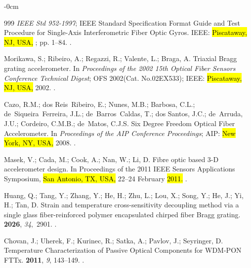 \documentclass[sensors,article,accept,pdftex,moreauthors]{Definitions/mdpi}
\begin{document}
\begin{adjustwidth}{-\extralength}{0cm}
\begin{thebibliography}{999}
{\em IEEE Std 952-1997};
\newblock IEEE Standard Specification Format Guide and Test Procedure for Single-Axis Interferometric Fiber Optic Gyros. IEEE: \hl{Piscataway, NJ, USA,}
; pp. 1--84.
.

Morikawa, S.; Ribeiro, A.; Regazzi, R.; Valente, L.; Braga, A.
\newblock Triaxial Bragg grating accelerometer.
\newblock In \emph{Proceedings of the 2002 15th Optical Fiber Sensors Conference Technical Digest}; {OFS} 2002(Cat. No.02EX533); {IEEE}:  \hl{Piscataway, NJ, USA,} 2002.
.

Cazo, R.M.; dos Reis~Ribeiro, E.; Nunes, M.B.; Barbosa, C.L.; de~Siqueira~Ferreira, J.L.; de~Barros~Caldas, T.; dos Santos, J.C.; de~Arruda, J.U.; Cordeiro, C.M.B.; de~Matos, C.J.S.
\newblock Six Degree Freedom Optical Fiber Accelerometer.
\newblock In \emph{Proceedings of the AIP Conference Proceedings}; AIP: \hl{New York, NY, USA,} 2008.
.

Masek, V.; Cada, M.; Cook, A.; Nan, W.; Li, D.
\newblock Fibre optic based 3-D accelerometer design.
\newblock In Proceedings of the 2011 IEEE Sensors Applications Symposium,  \hl{San Antonio, TX, USA,} 22--24 February \hl{2011.} %
.

Huang, Q.; Tang, Y.; Zhang, Y.; He, H.; Zhu, L.; Lou, X.; Song, Y.; He, J.; Yi, H.; Tan, D.
\newblock Strain and temperature cross-sensitivity decoupling method via a single glass fiber-reinforced polymer encapsulated chirped fiber Bragg grating.
 {\bf 2026}, {\em 34},~2901.
.

Chovan, J.; Uherek, F.; Kurinec, R.; Satka, A.; Pavlov, J.; Seyringer, D.
\newblock Temperature Characterization of Passive Optical Components for WDM-PON FTTx.
 {\bf 2011}, {\em 9}, 143--149.
.


\end{thebibliography}
\end{adjustwidth}
\end{document}
